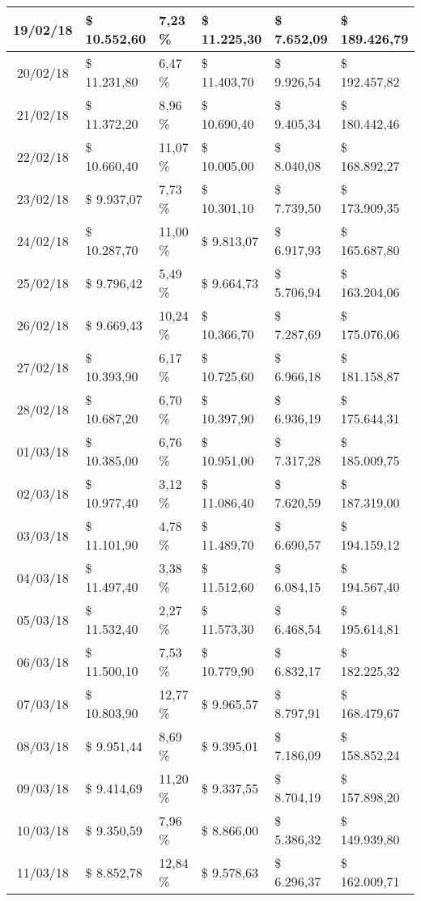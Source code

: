 \begin{small}
\begin{longtable}{|c|l|l|l|l|l|}
19/02/18 & \$ 10.552,60 & 7,23 \% & \$ 11.225,30 & \$ 7.652,09 & \$ 189.426,79 \\ \hline
20/02/18 & \$ 11.231,80 & 6,47 \% & \$ 11.403,70 & \$ 9.926,54 & \$ 192.457,82 \\ \hline
21/02/18 & \$ 11.372,20 & 8,96 \% & \$ 10.690,40 & \$ 9.405,34 & \$ 180.442,46 \\ \hline
22/02/18 & \$ 10.660,40 & 11,07 \% & \$ 10.005,00 & \$ 8.040,08 & \$ 168.892,27 \\ \hline
23/02/18 & \$ 9.937,07 & 7,73 \% & \$ 10.301,10 & \$ 7.739,50 & \$ 173.909,35 \\ \hline
24/02/18 & \$ 10.287,70 & 11,00 \% & \$ 9.813,07 & \$ 6.917,93 & \$ 165.687,80 \\ \hline
25/02/18 & \$ 9.796,42 & 5,49 \% & \$ 9.664,73 & \$ 5.706,94 & \$ 163.204,06 \\ \hline
26/02/18 & \$ 9.669,43 & 10,24 \% & \$ 10.366,70 & \$ 7.287,69 & \$ 175.076,06 \\ \hline
27/02/18 & \$ 10.393,90 & 6,17 \% & \$ 10.725,60 & \$ 6.966,18 & \$ 181.158,87 \\ \hline
28/02/18 & \$ 10.687,20 & 6,70 \% & \$ 10.397,90 & \$ 6.936,19 & \$ 175.644,31 \\ \hline
01/03/18 & \$ 10.385,00 & 6,76 \% & \$ 10.951,00 & \$ 7.317,28 & \$ 185.009,75 \\ \hline
02/03/18 & \$ 10.977,40 & 3,12 \% & \$ 11.086,40 & \$ 7.620,59 & \$ 187.319,00 \\ \hline
03/03/18 & \$ 11.101,90 & 4,78 \% & \$ 11.489,70 & \$ 6.690,57 & \$ 194.159,12 \\ \hline
04/03/18 & \$ 11.497,40 & 3,38 \% & \$ 11.512,60 & \$ 6.084,15 & \$ 194.567,40 \\ \hline
05/03/18 & \$ 11.532,40 & 2,27 \% & \$ 11.573,30 & \$ 6.468,54 & \$ 195.614,81 \\ \hline
06/03/18 & \$ 11.500,10 & 7,53 \% & \$ 10.779,90 & \$ 6.832,17 & \$ 182.225,32 \\ \hline
07/03/18 & \$ 10.803,90 & 12,77 \% & \$ 9.965,57 & \$ 8.797,91 & \$ 168.479,67 \\ \hline
08/03/18 & \$ 9.951,44 & 8,69 \% & \$ 9.395,01 & \$ 7.186,09 & \$ 158.852,24 \\ \hline
09/03/18 & \$ 9.414,69 & 11,20 \% & \$ 9.337,55 & \$ 8.704,19 & \$ 157.898,20 \\ \hline
10/03/18 & \$ 9.350,59 & 7,96 \% & \$ 8.866,00 & \$ 5.386,32 & \$ 149.939,80 \\ \hline
11/03/18 & \$ 8.852,78 & 12,84 \% & \$ 9.578,63 & \$ 6.296,37 & \$ 162.009,71 \\ \hline

\end{longtable}
\end{small}
